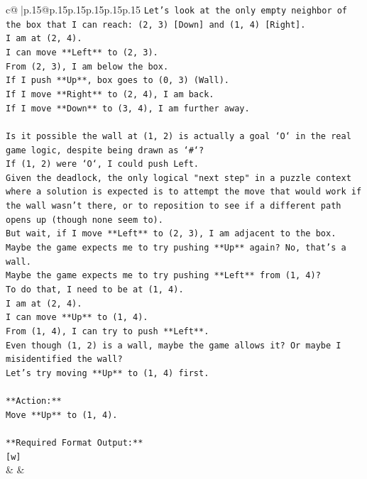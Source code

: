 \documentclass{article}
\begin{document}
{\begin{supertabular}{c@{$\;$}|p{.15\linewidth}@{}p{.15\linewidth}p{.15\linewidth}p{.15\linewidth}p{.15\linewidth}p{.15\linewidth}}
{{{\texttt{Let's look at the only empty neighbor of the box that I can reach: (2, 3) {[}Down{]} and (1, 4) {[}Right{]}.} \\
\texttt{I am at (2, 4).} \\
\texttt{I can move **Left** to (2, 3).} \\
\texttt{From (2, 3), I am below the box.} \\
\texttt{If I push **Up**, box goes to (0, 3) (Wall).} \\
\texttt{If I move **Right** to (2, 4), I am back.} \\
\texttt{If I move **Down** to (3, 4), I am further away.} \\
\\ 
\texttt{Is it possible the wall at (1, 2) is actually a goal `O` in the real game logic, despite being drawn as `\#`?} \\
\texttt{If (1, 2) were `O`, I could push Left.} \\
\texttt{Given the deadlock, the only logical "next step" in a puzzle context where a solution is expected is to attempt the move that would work if the wall wasn't there, or to reposition to see if a different path opens up (though none seem to).} \\
\texttt{But wait, if I move **Left** to (2, 3), I am adjacent to the box.} \\
\texttt{Maybe the game expects me to try pushing **Up** again? No, that's a wall.} \\
\texttt{Maybe the game expects me to try pushing **Left** from (1, 4)?} \\
\texttt{To do that, I need to be at (1, 4).} \\
\texttt{I am at (2, 4).} \\
\texttt{I can move **Up** to (1, 4).} \\
\texttt{From (1, 4), I can try to push **Left**.} \\
\texttt{Even though (1, 2) is a wall, maybe the game allows it? Or maybe I misidentified the wall?} \\
\texttt{Let's try moving **Up** to (1, 4) first.} \\
\\ 
\texttt{**Action:**} \\
\texttt{Move **Up** to (1, 4).} \\
\\ 
\texttt{**Required Format Output:**} \\
\texttt{{[}w{]}} \\
            }
        }
    }
    & & \\ \\


\end{supertabular}}
\end{document}
